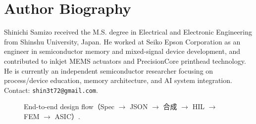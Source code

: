 \documentclass[conference]{IEEEtran}
\begin{document}
\section*{Author Biography}
\begingroup\small
Shinichi Samizo received the M.S. degree in Electrical and Electronic Engineering from Shinshu University, Japan. He worked at Seiko Epson Corporation as an engineer in semiconductor memory and mixed-signal device development, and contributed to inkjet MEMS actuators and PrecisionCore printhead technology. He is currently an independent semiconductor researcher focusing on process/device education, memory architecture, and AI system integration. Contact: \texttt{shin3t72@gmail.com}.
\endgroup

\FloatBarrier


\begin{figure}[!t]
  \centering
  \caption{End-to-end design flow（Spec $\to$ JSON $\to$ 合成 $\to$ HIL $\to$ FEM $\to$ ASIC）.}
  \label{fig:flow}
\end{figure}
\end{document}
